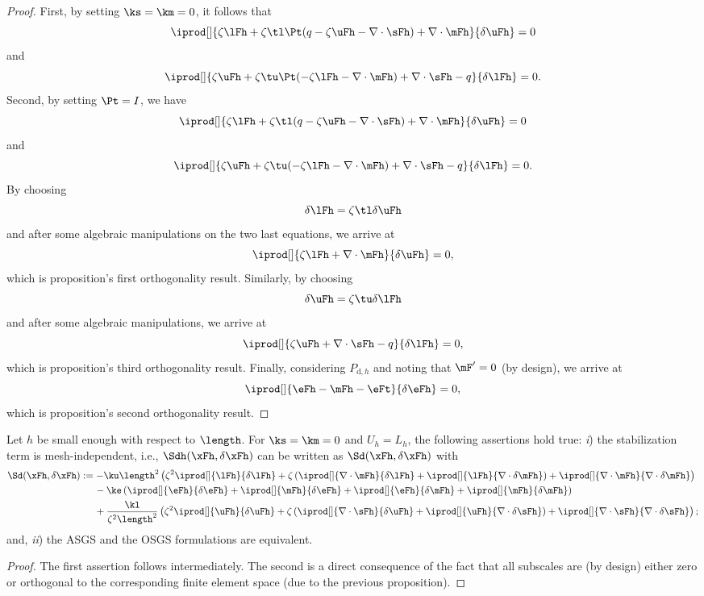\begin{proof}
First, by setting $\ks = \km = 0$, it follows that
$$\iprod[]{\zeta\lFh+\zeta\tl\Pt(q-\zeta\uFh-\nabla\cdot \sFh)+\nabla\cdot\mFh}{\delta\uFh} = 0$$
and
$$\iprod[]{\zeta\uFh+\zeta\tu\Pt(-\zeta\lFh-\nabla\cdot\mFh)+\nabla\cdot\sFh-q}{\delta\lFh} = 0.$$
%
Second, by setting $\Pt = I$, we have
%
$$\iprod[]{\zeta\lFh+\zeta\tl(q-\zeta\uFh-\nabla\cdot\sFh)+\nabla\cdot\mFh}{\delta\uFh} = 0$$
and
$$\iprod[]{\zeta\uFh+\zeta\tu(-\zeta\lFh-\nabla\cdot\mFh)+\nabla\cdot\sFh-q}{\delta\lFh} = 0.$$
By choosing
$$\delta\lFh = \zeta\tl\delta\uFh$$
and after some algebraic manipulations on the two last equations, we arrive at
$$\iprod[]{\zeta\lFh+\nabla\cdot\mFh}{\delta\uFh} =  0,$$
which is proposition’s first orthogonality result.
Similarly, by choosing
$$\delta\uFh = \zeta\tu\delta\lFh$$
and after some algebraic manipulations, we arrive at
$$\iprod[]{\zeta\uFh+\nabla\cdot\sFh-q}{\delta\lFh} = 0,$$
which is proposition’s third orthogonality result. Finally, considering $P_{\mathrm{d},h}$ and noting that $\mF' = 0$ (by design), we arrive at
$$
\iprod[]{\eFh-\mFh-\eFt}{\delta\eFh}=0,$$
which is proposition's second orthogonality result.
\end{proof}
\begin{proposition}
Let $h$ be small enough with respect to $\length$. For $\ks=\km=0$ and $U_h = L_h$, the following assertions hold true: \textit{i}) the stabilization term is mesh-independent, i.e., $\Sdh(\xFh,\delta\xFh)$ can be written as $\Sd(\xFh,\delta\xFh)$ with
\begin{align*}
\Sd(\xFh,\delta\xFh)
&:=-\ku \length^2\left(\zeta^2\iprod[]{\lFh}{\delta\lFh}+\zeta\left(\iprod[]{\nabla\cdot\mFh}{\delta\lFh}+\iprod[]{\lFh}{\nabla\cdot\delta\mFh}\right)+\iprod[]{\nabla\cdot\mFh}{\nabla\cdot\delta \mFh}\right)\\
&\quad\:\:-\ke\left(\iprod[]{\eFh}{\delta\eFh}+\iprod[]{\mFh}{\delta\eFh}+\iprod[]{\eFh}{\delta \mFh}+\iprod[]{\mFh}{\delta\mFh}\right)\\
&\quad\:\:+\frac{\kl}{\zeta^2\length^2}\left(\zeta^2\iprod[]{\uFh}{\delta\uFh}+\zeta\left(\iprod[]{\nabla\cdot\sFh}{\delta\uFh}+\iprod[]{\uFh}{\nabla\cdot\delta\sFh}\right)+\iprod[]{\nabla\cdot\sFh}{\nabla\cdot\delta \sFh}\right);
\end{align*}
and, \textit{ii}) the ASGS and the OSGS formulations are equivalent.
\end{proposition}
\begin{proof}
    The first assertion follows intermediately. The second is a direct consequence of the fact that all subscales are (by design) either zero  or orthogonal to the corresponding finite element space (due to the previous proposition).
\end{proof}